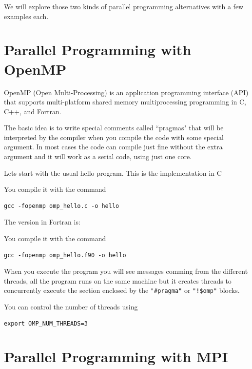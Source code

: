 We will explore those two kinds of parallel programming alternatives with a few examples each.

\section{Parallel Programming with OpenMP}

OpenMP (Open Multi-Processing) is an application programming interface (API) that supports multi-platform shared memory multiprocessing programming in C, C++, and Fortran.

The basic idea is to write special comments called ``pragmas" that will be interpreted by the compiler when you compile the code with some special argument. In most cases the code can compile just fine without the extra argument and it will work as a serial code, using just one core.

Lets start with the usual hello program. This is the implementation in C 



You compile it with the command

\begin{lstlisting}
gcc -fopenmp omp_hello.c -o hello
\end{lstlisting}

The version in Fortran is:



You compile it with the command

\begin{lstlisting}
gcc -fopenmp omp_hello.f90 -o hello
\end{lstlisting}

When you execute the program you will see messages comming from the different threads, all the program runs on the same machine but it creates threads to concurrently execute the section enclosed by the \verb|"#pragma"| or \verb|"!$omp"|
blocks.

You can control the number of threads using

\begin{lstlisting}
export OMP_NUM_THREADS=3
\end{lstlisting}


\section{Parallel Programming with MPI}


